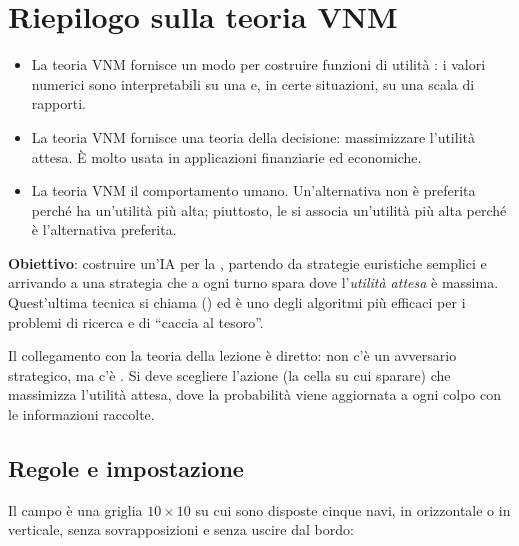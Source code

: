 \section{Riepilogo sulla teoria VNM}

\begin{itemize}
  \item La teoria VNM fornisce un modo per costruire funzioni di utilità :
        i valori numerici sono interpretabili su una  e, in certe
        situazioni, su una scala di rapporti.
  \item La teoria VNM fornisce una teoria  della decisione: massimizzare
        l'utilità attesa. È molto usata in applicazioni finanziarie ed economiche.
  \item La teoria VNM  il comportamento umano. Un'alternativa non è
        preferita perché ha un'utilità più alta; piuttosto, le si associa un'utilità più
        alta perché è l'alternativa preferita.
\end{itemize}


\textbf{Obiettivo}: costruire un'IA per la , partendo da strategie
euristiche semplici e arrivando a una strategia  che a ogni turno spara dove
l'\emph{utilità attesa} è massima. Quest'ultima tecnica si chiama 
() ed è uno degli algoritmi più efficaci per i problemi di ricerca e
di ``caccia al tesoro''.

Il collegamento con la teoria della lezione è diretto: non c'è un avversario strategico,
ma c'è . Si deve scegliere l'azione (la cella su cui sparare) che
massimizza l'utilità attesa, dove la probabilità viene aggiornata a ogni colpo con le
informazioni raccolte.

\subsection{Regole e impostazione}

Il campo è una griglia $10 \times 10$ su cui sono disposte cinque navi, in orizzontale o
in verticale, senza sovrapposizioni e senza uscire dal bordo:

